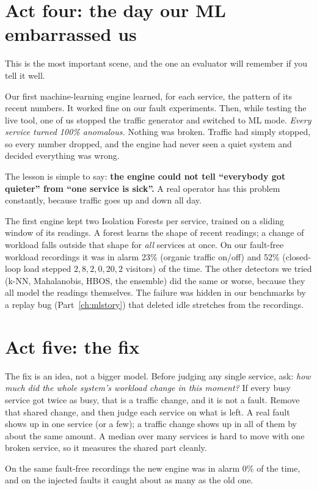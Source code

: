 \section{Act four: the day our ML embarrassed us}
\begin{simplebox}
This is the most important scene, and the one an evaluator will remember if you tell it well.

Our first machine-learning engine learned, for each service, the pattern of its recent numbers. It worked fine on our fault experiments. Then, while testing the live tool, one of us stopped the traffic generator and switched to ML mode. \emph{Every service turned 100\% anomalous.} Nothing was broken. Traffic had simply stopped, so every number dropped, and the engine had never seen a quiet system and decided everything was wrong.

The lesson is simple to say: \textbf{the engine could not tell ``everybody got quieter'' from ``one service is sick''.} A real operator has this problem constantly, because traffic goes up and down all day.
\end{simplebox}

\begin{techbox}
The first engine kept two Isolation Forests per service, trained on a sliding window of its readings. A forest learns the shape of recent readings; a change of workload falls outside that shape for \emph{all} services at once. On our fault-free workload recordings it was in alarm 23\% (organic traffic on/off) and 52\% (closed-loop load stepped $2,8,2,0,20,2$ visitors) of the time. The other detectors we tried (k-NN, Mahalanobis, HBOS, the ensemble) did the same or worse, because they all model the readings themselves. The failure was hidden in our benchmarks by a replay bug (Part~\ref{ch:mlstory}) that deleted idle stretches from the recordings.
\end{techbox}

\section{Act five: the fix}
\begin{simplebox}
The fix is an idea, not a bigger model. Before judging any single service, ask: \emph{how much did the whole system's workload change in this moment?} If every busy service got twice as busy, that is a traffic change, and it is not a fault. Remove that shared change, and then judge each service on what is left. A real fault shows up in one service (or a few); a traffic change shows up in all of them by about the same amount. A median over many services is hard to move with one broken service, so it measures the shared part cleanly.

On the same fault-free recordings the new engine was in alarm 0\% of the time, and on the injected faults it caught about as many as the old one.
\end{simplebox}


